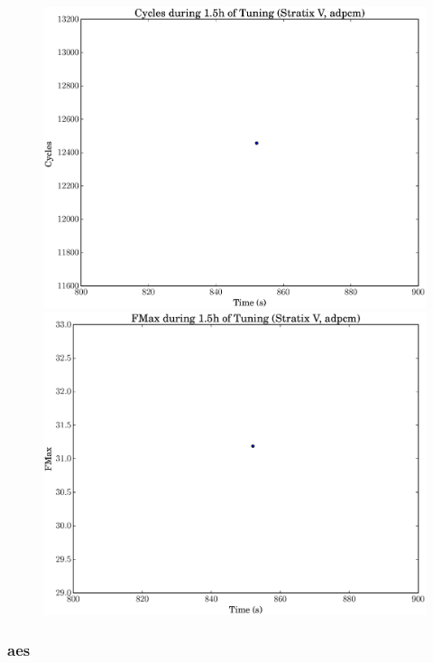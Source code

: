 \documentclass[12pt, a4paper]{article}
\begin{document}
\begin{figure}[htpb]
    \begin{minipage}{.48\textwidth}
        \includegraphics[scale=.25]{adpcm_cycles_5400_chstone_StratixV}
    \end{minipage}%
    \hfill
    \begin{minipage}{.48\textwidth}
        \includegraphics[scale=.25]{adpcm_fmax_5400_chstone_StratixV}
    \end{minipage}%
\end{figure}

\newpage

\subsubsection{aes}
\end{document}
